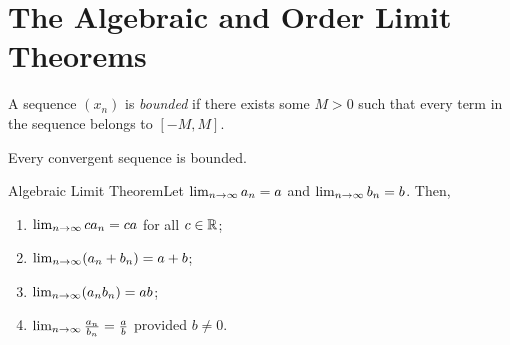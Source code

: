 \renewcommand{\theenumi}{\arabic{enumi}}
\renewcommand{\labelenumi}{\theenumi.}
\section{The Algebraic and Order Limit Theorems}

\begin{definition}
    A sequence \((x_n)\) is \textit{bounded} if there exists some \(M > 0\) such that every term in the sequence belongs to \([-M,M]\).
\end{definition}

\begin{theorem}
    Every convergent sequence is bounded.
\end{theorem}


\begin{ntheorem}
    {Algebraic Limit Theorem}Let \(\lim_{n \rightarrow \infty}a_n = a\) and \(\lim_{n \rightarrow \infty}b_n = b\). Then,
    \begin{enumerate}[label=(\roman*)]
        \item \(\lim_{n \rightarrow \infty}ca_n = ca\) for all \(c \in \mathbb{R}\);
        \item \(\lim_{n \rightarrow \infty}(a_n + b_n) = a + b\);
        \item \(\lim_{n \rightarrow \infty}(a_nb_n) = ab\);
        \item \(\lim_{n \rightarrow \infty}\frac{a_n}{b_n} = \frac{a}{b}\) provided \(b \neq 0\).
    \end{enumerate}
\end{ntheorem}

